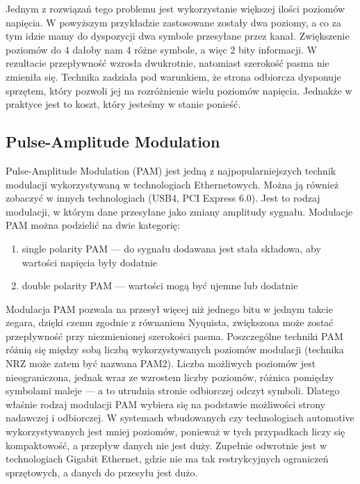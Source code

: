 Jednym z rozwiązań tego problemu jest wykorzystanie większej ilości poziomów napięcia. W powyższym przykładzie zastosowane zostały dwa poziomy, a co za tym idzie mamy do dyspozycji dwa symbole przesyłane przez kanał.
Zwiększenie poziomów do 4 dałoby nam 4 różne symbole, a więc 2 bity informacji. W rezultacie przepływność wzrosła dwukrotnie, natomiast szerokość pasma nie zmieniła się. Technika zadziała pod warunkiem, że strona odbiorcza dysponuje sprzętem, który pozwoli jej na
rozróżnienie wielu poziomów napięcia. Jednakże w praktyce jest to koszt, który jesteśmy w stanie ponieść.

\subsection{Pulse-Amplitude Modulation}

Pulse-Amplitude Modulation (PAM) jest jedną z najpopularniejszych technik modulacji wykorzystywaną w technologiach Ethernetowych. Można ją również zobaczyć w innych technologiach (USB4, PCI Express 6.0). Jest to rodzaj modulacji, w którym dane przesyłane jako zmiany amplitudy sygnału. Modulacje PAM można podzielić na dwie kategorię:

\begin{enumerate}
    \item single polarity PAM --- do sygnału dodawana jest stała składowa, aby wartości napięcia były dodatnie
    \item double polarity PAM --- wartości mogą być ujemne lub dodatnie
\end{enumerate}

Modulacja PAM pozwala na przesył więcej niż jednego bitu w jednym takcie zegara, dzięki czemu zgodnie z równaniem Nyquista, zwiększona może zostać przepływność przy niezmienionej szerokości pasma.
Poszczególne techniki PAM różnią się między sobą liczbą wykorzystywanych poziomów modulacji (technika NRZ może zatem być nazwana PAM2).
Liczba możliwych poziomów jest nieograniczona, jednak wraz ze wzrostem liczby poziomów, różnica pomiędzy symbolami maleje --- a to utrudnia stronie odbiorczej odczyt symboli. Dlatego właśnie rodzaj modulacji PAM wybiera się na podstawie możliwości strony nadawczej i odbiorczej. W systemach wbudowanych czy technologiach automotive wykorzystywanych jest mniej poziomów,
ponieważ w tych przypadkach liczy się kompaktowość, a przepływ danych nie jest duży. Zupełnie odwrotnie jest w technologiach Gigabit Ethernet, gdzie nie ma tak restrykcyjnych ograniczeń sprzętowych, a danych do przesyłu jest dużo.

